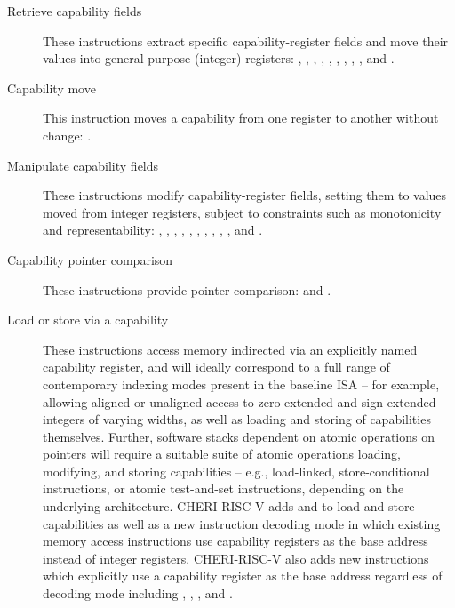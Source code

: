 \begin{description}
\item[Retrieve capability fields]
These instructions extract specific capability-register fields and move their
values into general-purpose (integer) registers:
, , , ,
, , ,
, , and .

\item[Capability move]
This instruction moves a capability from one register to another without
change: .

\item[Manipulate capability fields]
These instructions modify capability-register fields, setting them to values
moved from integer registers, subject to constraints such as monotonicity and
representability: , ,
, ,
, ,
, ,
, , and
.

\item[Capability pointer comparison]
These instructions provide pointer comparison:
 and
.

\item[Load or store via a capability]
These instructions access memory indirected via an explicitly named capability
register, and will ideally correspond to a full range of contemporary
indexing modes present in the baseline ISA -- for example, allowing aligned or
unaligned access to zero-extended and sign-extended integers of varying
widths, as well as loading and storing of capabilities themselves.
Further, software stacks dependent on atomic operations on pointers will
require a suitable suite of atomic operations loading, modifying, and storing
capabilities -- e.g., load-linked, store-conditional instructions, or atomic
test-and-set instructions, depending on the underlying architecture.
CHERI-RISC-V adds  and  to load and store
capabilities as well as a new instruction decoding mode in which existing
memory access instructions use capability registers as the base
address instead of integer registers.  CHERI-RISC-V also adds new
instructions which explicitly use a capability register as the base
address regardless of decoding mode including
, ,
, and .


\end{description}

